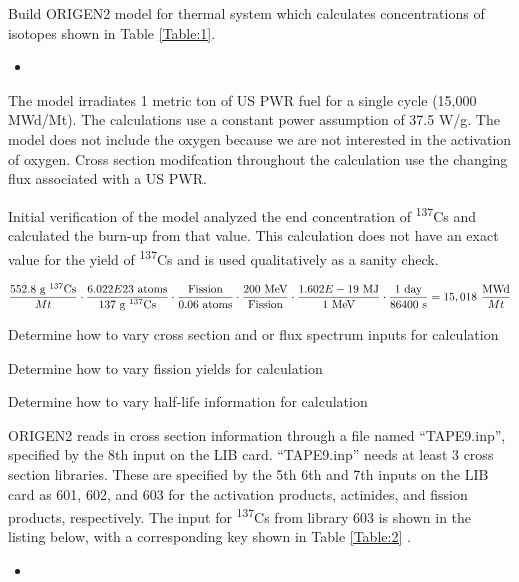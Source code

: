 \documentclass[11pt,notitlepage]{article}
\newcommand{\tss}{\textsuperscript}
\newcommand{\inputdeck}[2]{
\begin{itemize}
\item[]
\end{itemize}
}
\newcommand{\inputdeckpages}[4]{
\begin{itemize}
\item[]
\end{itemize}
}
\newcommand{\cmark}{\ding{51}}%
\newcommand{\done}{\rlap{$\square$}{\raisebox{2pt}{\large\hspace{1pt}\cmark}}%
  \hspace{-2.5pt}}
\begin{document}
\begin{todolist}
\item[\done]{Build ORIGEN2 model for thermal system which
  calculates concentrations of isotopes shown in
  Table \ref{Table:1}.}

  \inputdeck{../Origen2/TAPE5}{PWR Input Deck}

  The model irradiates 1 metric ton of US PWR fuel for a single
  cycle (15,000 MWd/Mt). The calculations use a constant power assumption
  of 37.5 W/g. The model does not include the oxygen because
  we are not interested in the activation of oxygen.
  Cross section modifcation throughout the calculation
  use the changing flux associated with a US PWR. 

  Initial verification of the model analyzed the end concentration of
  \tss{137}Cs and calculated the burn-up from that value. This calculation
  does not have an exact value for the yield of \tss{137}Cs and is
  used qualitatively as a sanity check.

  \begin{equation*}
    \frac{552.8\ \text{g \tss{137}Cs}}{Mt}\cdot
    \frac{6.022E23\ \text{atoms}}{137\ \text{g \tss{137}Cs}}\cdot
    \frac{\text{Fission}}{0.06\ \text{atoms}}\cdot
    \frac{200\ \text{MeV}}{\text{Fission}}\cdot
    \frac{1.602E-19\ \text{MJ}}{1\ \text{MeV}}\cdot
    \frac{1\ \text{day}}{86400\ \text{s}}=15,018\ \frac{\text{MWd}}{Mt}
  \end{equation*}

\item[\done]{Determine how to vary cross section and or flux spectrum
  inputs for calculation}
\item[\done]{Determine how to vary fission yields for calculation}
\item[\done]{Determine how to vary half-life information for calculation}
  
  ORIGEN2 reads in cross section information through a file
  named ``TAPE9.inp'', specified by the 8th input on the LIB card.
  ``TAPE9.inp'' needs at least 3 cross section libraries. These
  are specified by the 5th 6th and 7th inputs on the LIB card as
  601, 602, and 603 for the activation products, actinides, and
  fission products, respectively. The input for \tss{137}Cs
  from library 603 is shown in the listing below, with
  a corresponding key shown in Table \ref{Table:2} \cite{croff1980user}.
  
  \inputdeckpages{../Origen2/TAPE9_BANK}{\tss{137}Cs cross section
  library 603 input}{5066}{5067}


\end{todolist}
\end{document}
